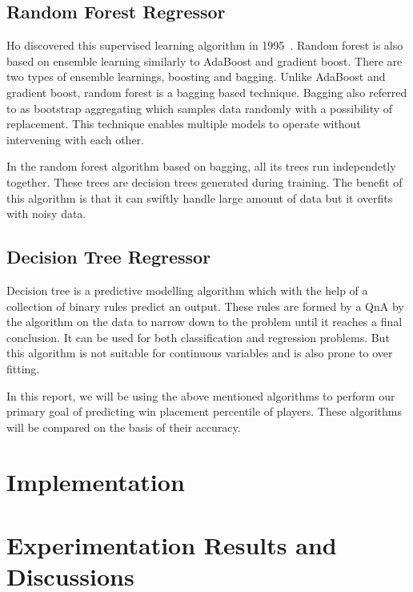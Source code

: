 \documentclass[journal,twoside,web]{ieeecolor}
\begin{document}
\subsection{Random Forest Regressor}
Ho discovered this supervised learning algorithm in 1995~\cite{tin_kam_ho_random_1995}. Random forest is also based on ensemble learning similarly to AdaBoost and gradient boost. There are two types of ensemble learnings, boosting and bagging. Unlike AdaBoost and gradient boost, random forest is a bagging based technique. Bagging also referred to as bootstrap aggregating which samples data randomly with a possibility of replacement. This technique enables multiple models to operate without intervening with each other.

In the random forest algorithm based on bagging, all its trees run independetly together. These trees are decision trees generated during training. The benefit of this algorithm is that it can swiftly handle large amount of data but it overfits with noisy data.

\subsection{Decision Tree Regressor}
Decision tree is a predictive modelling algorithm which with the help of a collection of binary rules predict an output. These rules are formed by a QnA by the algorithm on the data to narrow down to the problem until it reaches a final conclusion. It can be used for both classification and regression problems. But this algorithm is not suitable for continuous variables and is also prone to over fitting.

In this report, we will be using the above mentioned algorithms to perform our primary goal of predicting win placement percentile of players. These algorithms will be compared on the basis of their accuracy.

\section{Implementation}
\label{sec:implementation}

\section{Experimentation Results and Discussions}
\label{sec:discussion}
\end{document}
